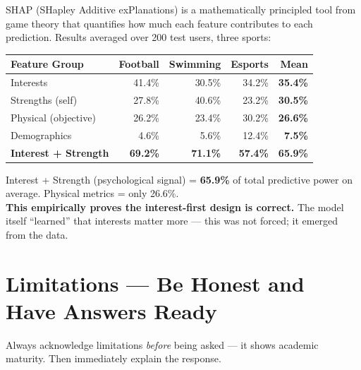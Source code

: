 \documentclass[12pt,a4paper]{article}
\begin{document}
SHAP (SHapley Additive exPlanations) is a mathematically principled tool
from game theory that quantifies how much each feature contributes to each
prediction. Results averaged over 200 test users, three sports:

\begin{center}
\begin{tabular}{lrrrr}
\toprule
\textbf{Feature Group} & \textbf{Football} & \textbf{Swimming} & \textbf{Esports} & \textbf{Mean} \\
\midrule
Interests          & 41.4\% & 30.5\% & 34.2\% & \textbf{35.4\%} \\
Strengths (self)   & 27.8\% & 40.6\% & 23.2\% & \textbf{30.5\%} \\
Physical (objective) & 26.2\% & 23.4\% & 30.2\% & \textbf{26.6\%} \\
Demographics       & 4.6\%  & 5.6\%  & 12.4\% & \textbf{7.5\%} \\
\midrule
\textbf{Interest + Strength} & \textbf{69.2\%} & \textbf{71.1\%} & \textbf{57.4\%} & \textbf{65.9\%} \\
\bottomrule
\end{tabular}
\end{center}

\begin{keybox}
Interest + Strength (psychological signal) = \textbf{65.9\%} of total
predictive power on average. Physical metrics = only 26.6\%.\\[4pt]
\textbf{This empirically proves the interest-first design is correct.}
The model itself ``learned'' that interests matter more --- this was not
forced; it emerged from the data.
\end{keybox}

\section{Limitations --- Be Honest and Have Answers Ready}

\begin{warnbox}
Always acknowledge limitations \emph{before} being asked --- it shows
academic maturity. Then immediately explain the response.
\end{warnbox}
\end{document}
